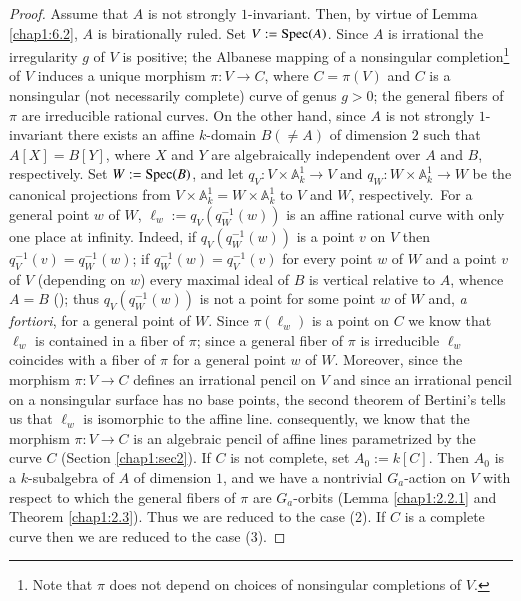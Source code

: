 \begin{proof}
Assume that $A$ is not strongly $1$-invariant. Then, by virtue of
Lemma \ref{chap1:6.2}, $A$ is birationally ruled. Set
$V:=\operatorname{Spec}(A)$. Since $A$ is irrational the irregularity $g$ of $V$ is
positive; the Albanese mapping of a nonsingular
completion\footnote{Note that $\pi$ does not depend on choices of
  nonsingular completions of $V$.}
of $V$ induces a unique morphism $\pi:V\to C$, where $C=\pi(V)$ and
$C$ is a nonsingular (not necessarily complete) curve of genus $g>0$;
the general fibers of $\pi$ are irreducible rational curves. On the
other hand, since $A$ is not strongly $1$-invariant there exists an
affine $k$-domain $B(\neq A)$ of dimension $2$ such that $A[X]=B[Y]$,
where $X$ and $Y$ are algebraically independent over $A$ and $B$,
respectively. Set $W:=\operatorname{Spec}(B)$, and let $q_{V}:V\times
\mathbb{A}^{1}_{k}\to V$ and $q_{W}:W\times\mathbb{A}^{1}_{k}\to W$ be
the canonical projections from
$V\times\mathbb{A}^{1}_{k}=W\times\mathbb{A}^{1}_{k}$ to $V$ and $W$,
respectively.\pageoriginale\ For a general point $w$ of $W$,
$\ell_{w}:=q_{V}(q^{-1}_{W}(w))$ is an affine rational curve with only
one place at infinity. Indeed, if $q_{V}(q^{-1}_{W}(w))$ is a point
$v$ on $V$ then $q^{-1}_{V}(v)=q^{-1}_{W}(w)$; if
$q^{-1}_{W}(w)=q^{-1}_{V}(v)$ for every point $w$ of $W$ and a point
$v$ of $V$ (depending on $w$) every maximal ideal of $B$ is vertical
relative to $A$, whence $A=B$ (\cf [1; (1.13)]); thus
$q_{V}(q^{-1}_{W}(w))$ is not a point for some point $w$ of $W$ and,
{\em a fortiori}, for a general point of $W$. Since $\pi(\ell_{w})$ is
a point on $C$ we know that $\ell_{w}$ is contained in a fiber of
$\pi$; since a general fiber of $\pi$ is irreducible $\ell_{w}$
coincides with a fiber of $\pi$ for a general point $w$ of
$W$. Moreover, since the morphism $\pi:V\to C$ defines an irrational
pencil on $V$ and since an irrational pencil on a nonsingular surface
has no base points, the second theorem of Bertini's tells us that
$\ell_{w}$ is isomorphic to the affine line. consequently, we know
that the morphism $\pi:V\to C$ is an algebraic pencil of affine lines
parametrized by the curve $C$ (\cf Section \ref{chap1:sec2}). If $C$
is not complete, set $A_{0}:=k[C]$. Then $A_{0}$ is a $k$-subalgebra
of $A$ of dimension $1$, and we have a nontrivial $G_{a}$-action on
$V$ with respect to which the general fibers of $\pi$ are
$G_{a}$-orbits (\cf Lemma \ref{chap1:2.2.1} and Theorem
\ref{chap1:2.3}). Thus we are reduced to the case (2). If $C$ is a
complete curve then we are reduced to the case (3).
\end{proof}

